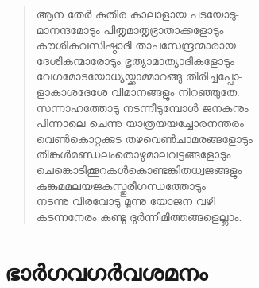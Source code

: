 \begin{verse}
ആന തേര്‍ കുതിര കാലാളായ പടയോടു-\\
മാനന്ദമോടും പിതൃമാതൃഭ്രാതാക്കളോടും\\
കൗശികവസിഷ്ഠാദി താപസേന്ദ്രന്മാരായ\\
ദേശികന്മാരോടും ഭൃത്യാമാത്യാദികളോടും\\
വേഗമോടയോധ്യയ്ക്കാമ്മാറങ്ങു തിരിച്ചപ്പോ-\\
ളാകാശദേശേ വിമാനങ്ങളും നിറഞ്ഞുതേ.\\
സന്നാഹത്തോടു നടന്നീടുമ്പോള്‍ ജനകനും\\
പിന്നാലെ ചെന്നു യാത്രയയച്ചോരനന്തരം\\
വെണ്‍കൊറ്റക്കുട തഴവെണ്‍ചാമരങ്ങളോടും\\
തിങ്കള്‍മണ്ഡലംതൊഴുമാലവട്ടങ്ങളോടും\\
ചെങ്കൊടിക്കൂറകള്‍കൊണ്ടങ്കിതധ്വജങ്ങളും\\
കുങ്കുമമലയജകസ്തൂരീഗന്ധത്തോടും\\
നടന്നു വിരവോടു മൂന്നു യോജന വഴി\\
കടന്നനേരം കണ്ടു ദുര്‍ന്നിമിത്തങ്ങളെല്ലാം.
\end{verse}


\section{ഭാര്‍ഗവഗർവശമനം}

